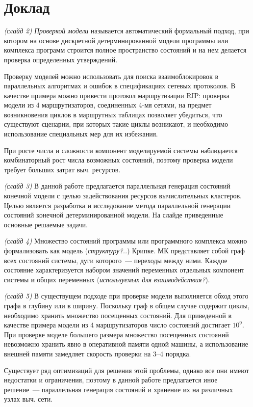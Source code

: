 \documentclass[a4paper,12pt,notitlepage]{article}
\begin{document}
\section{Доклад}

\emph{(слайд 2)} \emph{Проверкой модели} называется автоматический формальный подход, при
котором на основе дискретной детерминированной модели программы или комплекса программ
строится полное пространство состояний и на нем делается проверка определенных
утверждений.

Проверку моделей можно использовать для поиска взаимоблокировок в параллельных алгоритмах
и ошибок в спецификациях сетевых протоколов. В качестве примера можно привести протокол
маршрутизации RIP: проверка модели из 4 маршрутизаторов, соединенных 4-мя сетями, на
предмет возникновения циклов в маршрутных таблицах позволяет убедиться, что существуют
сценарии, при которых такие циклы возникают, и необходимо использование специальных мер
для их избежания.

При росте числа и сложности компонент моделируемой системы наблюдается комбинаторный рост
числа возможных состояний, поэтому проверка модели требует больших затрат выч. ресурсов.

\emph{(слайд 3)} В данной работе предлагается параллельная генерация состояний конечной
модели с целью задействования ресурсов вычислительных кластеров. Целью является разработка
и исследование метода параллельной генерации состояний конечной детерминированной
модели. На слайде приведенные основные решаемые задачи.

\emph{(слайд 4)} Множество состояний программы или программного комплекса можно
формализовать как модель (\emph{структуру?..}) Крипке. МК представляет собой граф всех
состояний системы, дуги которого~--- переходы между ними. Каждое состояние характеризуется
набором значений переменных отдельных компонент системы и общих переменных
(\emph{используемых для взаимодействия?}).

\emph{(слайд 5)} В существущем подходе при проверке модели выполняется обход этого графа в
глубину или в ширину. Поскольку граф в общем случае содержит циклы, необходимо хранить
множество посещенных состояний. Для приведенной в качестве примера модели из 4
маршрутизаторов число состояний достигает $10^9$. При проверке моделе большего размера
множество посещенных состояний невозможно хранить явно в оперативной памяти одной машины,
а использование внешней памяти замедляет скорость проверки на 3--4 порядка.

Существует ряд оптимизаций для решения этой проблемы, однако все они имеют недостатки и
ограничения, поэтому в данной работе предлагается иное решение~--- параллельная генерация
состояний и хранение их на различных узлах выч. сети.
\end{document}
